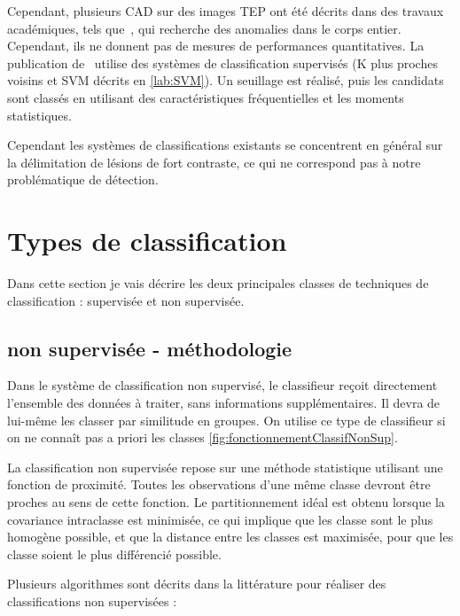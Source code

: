Cependant, plusieurs CAD sur des images TEP ont été décrits dans des travaux académiques, tels que~\cite{guan2006automatic}, qui recherche des anomalies dans le corps entier. Cependant, ils ne donnent pas de mesures de performances quantitatives. La publication de~\cite{Kanakatte2008pulmonary} utilise des systèmes de classification supervisés (K plus proches voisins et SVM décrits en \ref{lab:SVM}). Un seuillage est réalisé, puis les candidats sont classés en utilisant des caractéristiques fréquentielles et les moments statistiques. 

Cependant les systèmes de classifications existants se concentrent en général sur la délimitation de lésions de fort contraste, ce qui ne correspond pas à notre problématique de détection. 

	\section{Types de classification}

Dans cette section je vais décrire les deux principales classes de techniques de classification : supervisée et non supervisée.

		\subsection{non supervisée - méthodologie}

Dans le système de classification non supervisé, le classifieur reçoit directement l'ensemble des données à traiter, sans informations supplémentaires. Il devra de lui-même les classer par similitude en groupes. On utilise ce type de classifieur si on ne connaît pas a priori les classes \ref{fig:fonctionnementClassifNonSup}.

La classification non supervisée repose sur une méthode statistique utilisant une fonction de proximité. Toutes les observations d'une même classe devront être proches au sens de cette fonction. Le partitionnement idéal est obtenu lorsque la covariance intraclasse est minimisée, ce qui implique que les classe sont le plus homogène possible, et que la distance entre les classes est maximisée, pour que les classe soient le plus différencié possible.

Plusieurs algorithmes sont décrits dans la littérature pour réaliser des classifications non supervisées :

